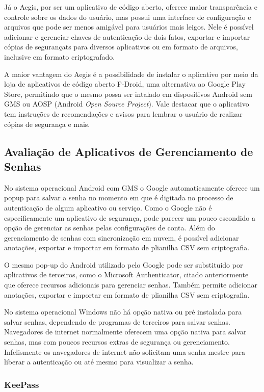 \documentclass[12pt]{article}
\begin{document}
Já o Aegis, por ser um aplicativo de código aberto, oferece maior transparência
e controle sobre os dados do usuário, mas possui uma interface de configuração
e arquivos que pode ser menos amigável para usuários mais leigos.
Nele é possível adicionar e gerenciar chaves de autenticação de dois fatos,
exportar e importar cópias de segurançats para diversos aplicativos ou em formato de arquivos,
inclusive em formato criptografado.

A maior vantagem do Aegis é a possibilidade de instalar o aplicativo por meio da
loja de aplicativos de código aberto F-Droid, uma alternativa ao Google Play
Store, permitindo que o mesmo possa ser intalado em dispositivos Android sem GMS
ou AOSP (Android \textit{Open Source Project}).
Vale destacar que o aplicativo tem instruções de recomendações e avisos para lembrar o usuário
de realizar cópias de segurança e mais.

\subsection{Avaliação de Aplicativos de Gerenciamento de Senhas}

No sistema operacional Android com GMS o Google automaticamente oferece um popup
para salvar a senha no momento em que é digitada no processo de autenticação de
algum aplicativo ou serviço.
Como o Google não é especificamente um aplicativo de segurança, pode parecer um
pouco escondido a opção de gerenciar as senhas pelas configurações de conta.
Além do gerenciamento de senhas com sincronização em nuvem, é possível adicionar
anotações, exportar e importar em formato de plianilha CSV sem criptografia.

O mesmo pop-up do Android utilizado pelo Google pode ser substituido por
aplicativos de terceiros, como o Microsoft Authenticator, citado anteriormente
que oferece recursos adicionais para gerenciar senhas.
Também permite adicionar anotações, exportar e importar em formato de plianilha
CSV sem criptografia.

No sistema operacional Windows não há opção nativa ou pré instalada para
salvar senhas, dependendo de programas de terceiros para salvar senhas.
Navegadores de internet normalmente oferecem uma opção nativa para salvar senhas,
mas com poucos recursos extras de segurança ou gerenciamento.
Infelismente os navegadores de internet não solicitam uma senha mestre para liberar
a autenticação ou até mesmo para visualizar a senha.

\subsubsection{KeePass}
\end{document}
